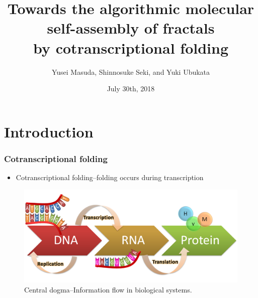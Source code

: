 \documentclass[dvipdfmx,10pt]{beamer}
\begin{document}
\title{Towards the algorithmic molecular self-assembly of fractals \\by cotranscriptional folding} 
\author{Yusei Masuda, Shinnosuke Seki, and Yuki Ubukata}
\date{July 30th, 2018}
\begin{frame}
\maketitle
\end{frame}

\section{Introduction}
\begin{frame}\frametitle{Cotranscriptional folding}
\begin{itemize}
\item Cotranscriptional folding--folding occurs during transcription
\end{itemize}
\begin{figure}
\centering
\includegraphics[width=0.7\linewidth]{central.png}
\caption{Central dogma--Information flow in biological systems.}
\end{figure}

\end{frame}
%
%
\end{document}
